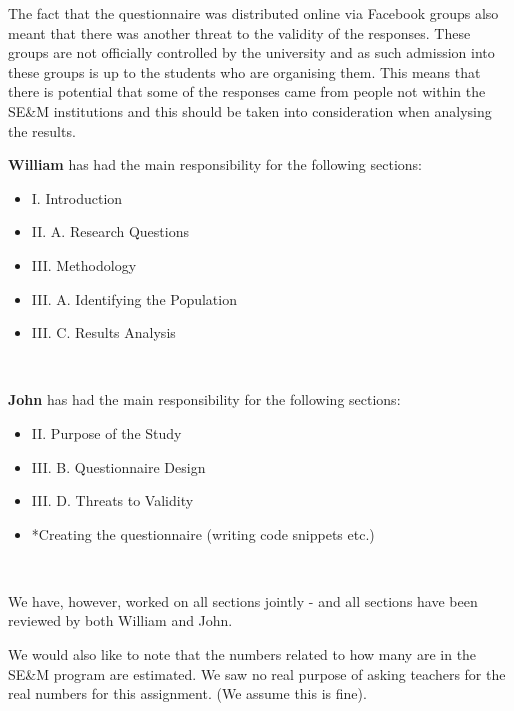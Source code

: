 \documentclass[times, 10pt,twocolumn]{IEEEtran}
\begin{document}
The fact that the questionnaire was distributed online via Facebook groups also meant that there was another threat to the validity of the responses. These groups are not officially controlled by the university and as such admission into these groups is up to the students who are organising them. This means that there is potential that some of the responses came from people not within the SE\&M institutions and this should be taken into consideration when analysing the results.





\vfill
\eject


\textbf{William} has had the main responsibility for the following sections:
\begin{itemize} \renewcommand{\labelitemi}{$\bullet$} 
\item I. Introduction
\item II. A. Research Questions
\item III. Methodology
\item III. A. Identifying the Population
\item III. C. Results Analysis
\end{itemize}
\ 


\textbf{John} has had the main responsibility for the following sections:
\begin{itemize} \renewcommand{\labelitemi}{$\bullet$} 
\item II. Purpose of the Study
\item III. B. Questionnaire Design
\item III. D. Threats to Validity
\item *Creating the questionnaire (writing code snippets etc.)
\end{itemize}
\

We have, however, worked on all sections jointly - and all sections have been reviewed by both William and John. 
\newline

We would also like to note that the numbers related to how many are in the SE\&M program are estimated. We saw no real purpose of asking teachers for the real numbers for this assignment. (We assume this is fine). 
\end{document}
